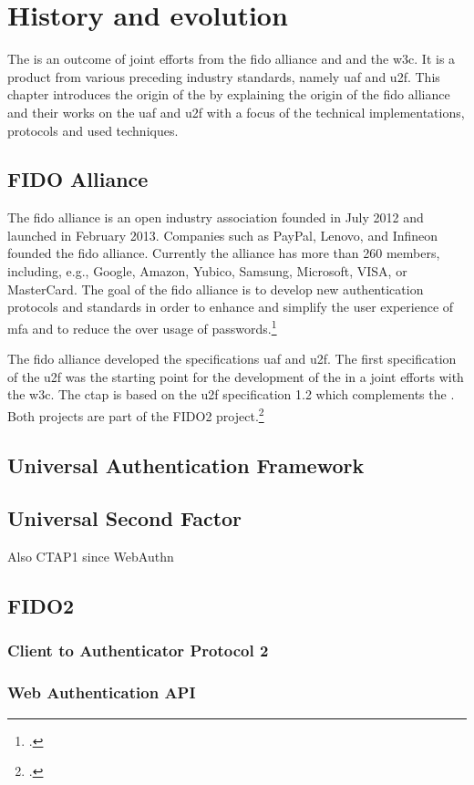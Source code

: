 
\section{History and evolution}

The \wa{} is an outcome of joint efforts from the \gls{fido} alliance and and the \gls{w3c}. It is a product from various preceding industry standards, namely \gls{uaf} and \gls{u2f}. This chapter introduces the origin of the \wa{} by explaining the origin of the \gls{fido} alliance and their works on the \gls{uaf} and \gls{u2f} with a focus of the technical implementations, protocols and used techniques.

\subsection{FIDO Alliance}

The \gls{fido} alliance is an open industry association founded in July 2012 and launched in February 2013. Companies such as PayPal, Lenovo, and Infineon founded the \gls{fido} alliance. Currently the alliance has more than 260 members, including, e.g., Google, Amazon, Yubico, Samsung, Microsoft, VISA, or MasterCard. The goal of the \gls{fido} alliance is to develop new authentication protocols and standards in order to enhance and simplify the user experience of \gls{mfa} and to reduce the over usage of passwords.\footcites[See][583]{eckert-it-sec-9}

The \gls{fido} alliance developed the specifications \gls{uaf} and \gls{u2f}. The first specification of the \gls{u2f} was the starting point for the development of the \wa{} in a joint efforts with the \gls{w3c}. The \gls{ctap} is based on the \gls{u2f} specification 1.2 which complements the \wa. Both projects are part of the FIDO2 project.\footcite[See][169--170]{grimes2017hacking}

\subsection{Universal Authentication Framework}

\subsection{Universal Second Factor}

Also CTAP1 since WebAuthn

\subsection{FIDO2}

\subsubsection{Client to Authenticator Protocol 2}

\subsubsection{Web Authentication API}